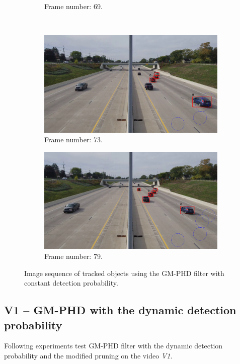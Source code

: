 \begin{figure}[H]
\begin{subfigure}{0.48\textwidth}
        \caption{Frame number: 69.}
        \label{fig:E1-V1-S0:06}
    \end{subfigure}
    \\
    \begin{subfigure}{0.48\textwidth}
        \centering
        \includegraphics[width=\linewidth]{../../../experiments/E1/V1/noPd/73}
        \caption{Frame number: 73.}
        \label{fig:E1-V1-S0:07}
    \end{subfigure}
    \begin{subfigure}{0.48\textwidth}
        \centering
        \includegraphics[width=\linewidth]{../../../experiments/E1/V1/noPd/79}
        \caption{Frame number: 79.}
        \label{fig:E1-V1-S0:08}
    \end{subfigure}
    \caption{Image sequence of tracked objects using the GM-PHD filter with constant detection probability.}
    \label{fig:E1-V1-S0}
\end{figure}

\subsection{V1 -- GM-PHD with the dynamic detection probability}
Following experiments test GM-PHD filter with the dynamic detection probability and the modified pruning on the video \textit{V1}.
